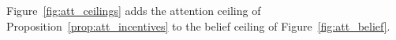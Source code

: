 Figure~\ref{fig:att_ceilings} adds the attention ceiling of Proposition~\ref{prop:att_incentives} to the belief ceiling of Figure~\ref{fig:att_belief}.
